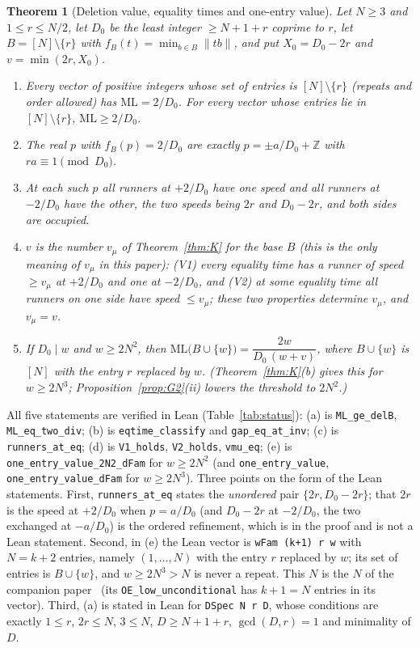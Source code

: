 \documentclass[11pt]{article}
\newtheorem{theorem}{Theorem}[section]
\theoremstyle{definition}
\theoremstyle{remark}
\newcommand{\nd}[1]{\lVert #1\rVert}
\newcommand{\ML}{\mathrm{ML}}
\newcommand{\ZZ}{\mathbb{Z}}
\begin{document}
\begin{theorem}[Deletion value, equality times and one-entry value]\label{thm:DEL}
Let $N\ge3$ and $1\le r\le N/2$, let $D_0$ be the least integer $\ge N+1+r$ coprime to $r$, let $B=[N]\setminus\{r\}$ with $f_B(t)=\min_{b\in B}\nd{tb}$, and put $X_0=D_0-2r$ and $v=\min(2r,X_0)$.
\begin{enumerate}[label=(\alph*),nosep]
\item Every vector of positive integers whose set of entries is $[N]\setminus\{r\}$ (repeats and order allowed) has $\ML=2/D_0$. For every vector whose entries lie in $[N]\setminus\{r\}$, $\ML\ge2/D_0$.
\item The real $p$ with $f_B(p)=2/D_0$ are exactly $p=\pm a/D_0+\ZZ$ with $ra\equiv1\pmod{D_0}$.
\item At each such $p$ all runners at $+2/D_0$ have one speed and all runners at $-2/D_0$ have the other, the two speeds being $2r$ and $D_0-2r$, and both sides are occupied.
\item $v$ is the number $v_\mu$ of Theorem~\ref{thm:K} for the base $B$ (this is the only meaning of $v_\mu$ in this paper): (V1) every equality time has a runner of speed $\ge v_\mu$ at $+2/D_0$ and one at $-2/D_0$, and (V2) at some equality time all runners on one side have speed $\le v_\mu$; these two properties determine $v_\mu$, and $v_\mu=v$.
\item If $D_0\mid w$ and $w\ge2N^2$, then $\ML\bigl(B\cup\{w\}\bigr)=\dfrac{2w}{D_0\,(w+v)}$, where $B\cup\{w\}$ is $[N]$ with the entry $r$ replaced by $w$. (Theorem~\ref{thm:K}(b) gives this for $w\ge2N^3$; Proposition~\ref{prop:G2}(ii) lowers the threshold to $2N^2$.)
\end{enumerate}
\end{theorem}
All five statements are verified in Lean (Table~\ref{tab:status}): (a) is \texttt{ML\_ge\_delB}, \texttt{ML\_eq\_two\_div}; (b) is \texttt{eqtime\_classify} and \texttt{gap\_eq\_at\_inv}; (c) is \texttt{runners\_at\_eq}; (d) is \texttt{V1\_holds}, \texttt{V2\_holds}, \texttt{vmu\_eq}; (e) is \texttt{one\_entry\_value\_2N2\_dFam} for $w\ge2N^2$ (and \texttt{one\_entry\_value}, \texttt{one\_entry\_value\_dFam} for $w\ge2N^3$). Three points on the form of the Lean statements. First, \texttt{runners\_at\_eq} states the \emph{unordered} pair $\{2r,D_0-2r\}$; that $2r$ is the speed at $+2/D_0$ when $p=a/D_0$ (and $D_0-2r$ at $-2/D_0$, the two exchanged at $-a/D_0$) is the ordered refinement, which is in the proof and is not a Lean statement. Second, in (e) the Lean vector is \texttt{wFam (k+1) r w} with $N=k+2$ entries, namely $(1,\dots,N)$ with the entry $r$ replaced by $w$; its set of entries is $B\cup\{w\}$, and $w\ge2N^3>N$ is never a repeat. This $N$ is the $N$ of the companion paper~\cite{A1} (its \texttt{OE\_low\_unconditional} has $k+1=N$ entries in its vector). Third, (a) is stated in Lean for \texttt{DSpec N r D}, whose conditions are exactly $1\le r$, $2r\le N$, $3\le N$, $D\ge N+1+r$, $\gcd(D,r)=1$ and minimality of $D$.
\end{document}
